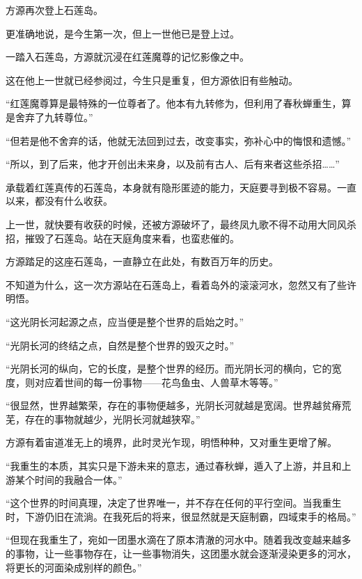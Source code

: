 
\begin{this_body}

方源再次登上石莲岛。

更准确地说，是今生第一次，但上一世他已是登上过。

一踏入石莲岛，方源就沉浸在红莲魔尊的记忆影像之中。

这在他上一世就已经参阅过，今生只是重复，但方源依旧有些触动。

“红莲魔尊算是最特殊的一位尊者了。他本有九转修为，但利用了春秋蝉重生，算是舍弃了九转尊位。”

“但若是他不舍弃的话，他就无法回到过去，改变事实，弥补心中的悔恨和遗憾。”

“所以，到了后来，他才开创出未来身，以及前有古人、后有来者这些杀招……”

承载着红莲真传的石莲岛，本身就有隐形匿迹的能力，天庭要寻到极不容易。一直以来，都没有什么收获。

上一世，就快要有收获的时候，还被方源破坏了，最终凤九歌不得不动用大同风杀招，摧毁了石莲岛。站在天庭角度来看，也蛮悲催的。

方源踏足的这座石莲岛，一直静立在此处，有数百万年的历史。

不知道为什么，这一次方源站在石莲岛上，看着岛外的滚滚河水，忽然又有了些许明悟。

“这光阴长河起源之点，应当便是整个世界的启始之时。”

“光阴长河的终结之点，自然是整个世界的毁灭之时。”

“光阴长河的纵向，它的长度，是整个世界的经历。而光阴长河的横向，它的宽度，则对应着世间的每一份事物——花鸟鱼虫、人兽草木等等。”

“很显然，世界越繁荣，存在的事物便越多，光阴长河就越是宽阔。世界越贫瘠荒芜，存在的事物就越少，光阴长河就越狭窄。”

方源有着宙道准无上的境界，此时灵光乍现，明悟种种，又对重生更增了解。

“我重生的本质，其实只是下游未来的意志，通过春秋蝉，遁入了上游，并且和上游某个时间的我融合一体。”

“这个世界的时间真理，决定了世界唯一，并不存在任何的平行空间。当我重生时，下游仍旧在流淌。在我死后的将来，很显然就是天庭制霸，四域束手的格局。”

“但现在我重生了，宛如一团墨水滴在了原本清澈的河水中。随着我改变越来越多的事物，让一些事物存在，让一些事物消失，这团墨水就会逐渐浸染更多的河水，将更长的河面染成别样的颜色。”


\end{this_body}
